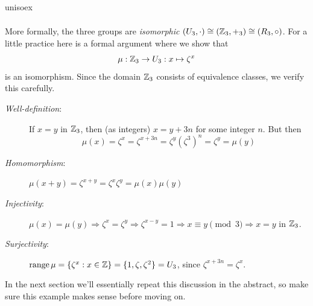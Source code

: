 \begin{examples}{}{unisoex}
\begin{enumerate}
\[\begin{array}{c||c|c|c}
			\end{array}
		\]
		More formally, the three groups are \emph{isomorphic} $(U_3,\cdot)\cong (\mathbb{Z}_3,+_3)\cong (R_3,\circ)$. For a little practice here is a formal argument where we show that 
		\[
			\mu:\mathbb{Z}_3\to U_3:x\mapsto\zeta^x
		\]
		is an isomorphism. Since the domain $\mathbb{Z}_3$ consists of equivalence classes, we verify this carefully.
	\begin{description}
  	\item[\emph{Well-definition}:] If $x=y$ in $\mathbb{Z}_3$, then (as integers) $x=y+3n$ for some integer $n$. But then
  	\[
  		\mu(x) =\zeta^x =\zeta^{x+3n} =\zeta^y(\zeta^{3})^n =\zeta^y =\mu(y)
  	\]
  	\item[\emph{Homomorphism}:] $\mu(x+y) =\zeta^{x+y} =\zeta^x\zeta^y =\mu(x)\mu(y)$
  	\item[\emph{Injectivity}:] $\mu(x)=\mu(y)\Longrightarrow \zeta^x=\zeta^y\Longrightarrow \zeta^{x-y}=1\Longrightarrow x\equiv y\pmod 3\Longrightarrow x=y$ in $\mathbb{Z}_3$.
  	\item[\emph{Surjectivity}:] $\operatorname{range}\mu =\{\zeta^x:x\in\mathbb{Z}\} =\{1,\zeta,\zeta^2\} =U_3$, since $\zeta^{x+3n}=\zeta^x$.
	\end{description}
In the next section we'll essentially repeat this discussion in the abstract, so make sure this example makes sense before moving on.
	\end{enumerate}
\end{examples}



% 
% 



